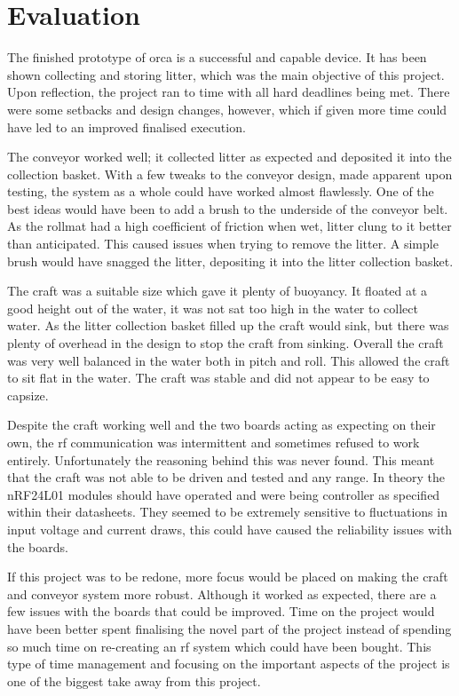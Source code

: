 \documentclass [11pt]{article}
\begin{document}
\section{Evaluation}

The finished prototype of \gls{orca} is a successful and capable device. It has been shown collecting and storing litter, which was the main objective of this project. Upon reflection, the project ran to time with all hard deadlines being met. There were some setbacks and design changes, however, which if given more time could have led to an improved finalised execution. 

The conveyor worked well; it collected litter as expected and deposited it into the collection basket.  With a few tweaks to the conveyor design, made apparent upon testing, the system as a whole could have worked almost flawlessly. One of the best ideas would have been to add a brush to the underside of the conveyor belt. As the \gls{rollmat} had a high coefficient of friction when wet, litter clung to it better than anticipated. This caused issues when trying to remove the litter. A simple brush would have snagged the litter, depositing it into the litter collection basket. 

The craft was a suitable size which gave it plenty of buoyancy. It floated at a good height out of the water, it was not sat too high in the water to collect water. As the litter collection basket filled up the craft would sink, but there was plenty of overhead in the design to stop the craft from sinking. Overall the craft was very well balanced in the water both in pitch and roll. This allowed the craft to sit flat in the water. The craft was stable and did not appear to be easy to capsize.  

Despite the craft working well and the two boards acting as expecting on their own, the \gls{rf} communication was intermittent and sometimes refused to work entirely. Unfortunately the reasoning behind this was never found. This meant that the craft was not able to be driven and tested and any range. In theory the nRF24L01 modules should have operated and were being controller as specified within their datasheets. They seemed to be extremely sensitive to fluctuations in input voltage and current draws, this could have caused the reliability issues with the boards. 

If this project was to be redone, more focus would be placed on making the craft and conveyor system more robust. Although it worked as expected, there are a few issues with the boards that could be improved. Time on the project would have been better spent finalising the novel part of the project instead of spending so much time on re-creating an \gls{rf} system which could have been bought. This type of time management and focusing on the important aspects of the project is one of the biggest take away from this project. 
\end{document}
